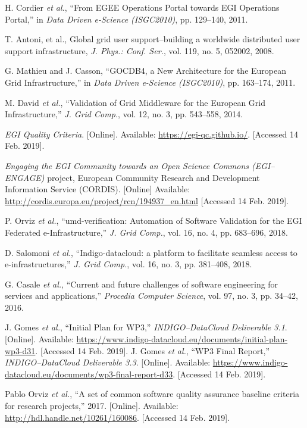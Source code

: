 \begin{thebibliography}{1}
H. Cordier \emph{et al.},
``From EGEE Operations Portal towards EGI Operations Portal,''
in \emph{Data Driven e-Science (ISGC2010)},
pp. 129--140, 2011.

T. Antoni, et al.,
Global grid user support--building a worldwide distributed user support infrastructure,
\emph{J. Phys.: Conf. Ser.},
vol. 119, no. 5, 052002, 2008.

G. Mathieu and J. Casson,
``GOCDB4, a New Architecture for the European Grid Infrastructure,''
in \emph{Data Driven e-Science (ISGC2010)},
pp. 163--174, 2011.

M. David \emph{et al.},
``Validation of Grid Middleware for the European Grid Infrastructure,''
\emph{J. Grid Comp.},
vol. 12, no. 3, pp. 543--558, 2014.

\emph{EGI Quality Criteria}.
[Online]. Available: \url{https://egi-qc.github.io/}.
[Accessed 14 Feb. 2019].

\emph{Engaging the EGI Community towards an Open Science Commons (EGI--ENGAGE)}
project, European Community Research and Development Information Service (CORDIS).
[Online] Available: \url{http://cordis.europa.eu/project/rcn/194937_en.html}
[Accessed 14 Feb. 2019].

P. Orviz \emph{et al.},
``umd-verification: Automation of Software Validation for the EGI Federated e-Infrastructure,''
\emph{J. Grid Comp.},
vol. 16, no. 4, pp. 683--696, 2018.

D. Salomoni \emph{et al.},
``Indigo-datacloud: a platform to facilitate seamless access to e-infrastructures,''
\emph{J. Grid Comp.},
vol. 16, no. 3, pp. 381--408, 2018.

G. Casale \emph{et al.},
``Current and future challenges of software engineering for services and applications,''
\emph{Procedia Computer Science},
vol. 97, no. 3, pp. 34--42, 2016.

J. Gomes \emph{et al.},
``Initial Plan for WP3,''
\emph{INDIGO--DataCloud Deliverable 3.1}.
[Online]. Available: \url{https://www.indigo-datacloud.eu/documents/initial-plan-wp3-d31}.
[Accessed 14 Feb. 2019].
J. Gomes \emph{et al.},
``WP3 Final Report,''
\emph{INDIGO--DataCloud Deliverable 3.3}.
[Online]. Available: \url{https://www.indigo-datacloud.eu/documents/wp3-final-report-d33}.
[Accessed 14 Feb. 2019].

Pablo Orviz \emph{et al.},
``A set of common software quality assurance baseline criteria for research projects,''
2017.
[Online]. Available: \url{http://hdl.handle.net/10261/160086}.
[Accessed 14 Feb. 2019].


\end{thebibliography}
